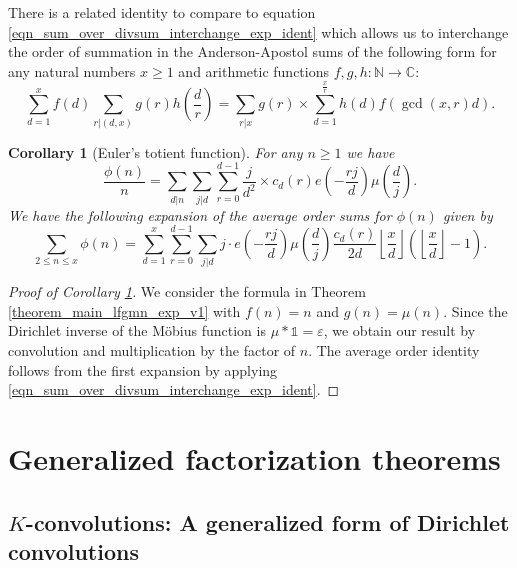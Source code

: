 \documentclass[12pt,reqno,a4letter]{article}
\numberwithin{figure}{section}
\numberwithin{table}{section}
\numberwithin{equation}{section}
\newcommand{\floor}[1]{\left\lfloor #1 \right\rfloor}
\newcommand{\e}[1]{e\left(#1\right)}
\theoremstyle{plain}
\newtheorem{cor}[theorem]{Corollary}
\numberwithin{theorem}{section}
\theoremstyle{definition}
\begin{document}
There is a related identity to compare to 
equation \eqref{eqn_sum_over_divsum_interchange_exp_ident} 
which allows us to interchange the order of 
summation in the Anderson-Apostol sums of the following form 
for any natural numbers $x \geq 1$ and arithmetic functions 
$f,g,h: \mathbb{N} \rightarrow \mathbb{C}$: 
\[
\sum_{d=1}^x f(d) \sum_{r|(d,x)} g(r) h\left(\frac{d}{r}\right) = 
       \sum_{r|x} g(r) \times \sum_{d=1}^{\frac{x}{r}} h(d) 
       f\left(\gcd(x,r) d\right). 
\]

\begin{cor}[Euler's totient function]
\label{cor_EulersTotientFunc_v5}
For any $n \geq 1$ we have 
\[
\frac{\phi(n)}{n} = \sum_{d|n} \sum_{j|d} \sum_{r=0}^{d-1} \frac{j}{d^2} \times c_d(r) 
     \e{-\frac{rj}{d}} \mu\left(\frac{d}{j}\right). 
\]
We have the following expansion of the average order sums for $\phi(n)$ 
given by 
\[
\sum_{2 \leq n \leq x} \phi(n) = \sum_{d=1}^x \sum_{r=0}^{d-1} \sum_{j|d}  
     j \cdot \e{-\frac{rj}{d}} \mu\left(\frac{d}{j}\right)  
     \frac{c_d(r)}{2d} \floor{\frac{x}{d}}\left(\floor{\frac{x}{d}}-1\right). 
\] 
\end{cor} 
\begin{proof}[Proof of Corollary \ref{cor_EulersTotientFunc_v5}]
We consider the formula in Theorem \ref{theorem_main_lfgmn_exp_v1} with 
$f(n) = n$ and $g(n) = \mu(n)$. Since the Dirichlet inverse of the M\"obius 
function is $\mu \ast \mathds{1} = \varepsilon$, we obtain our result by convolution and 
multiplication by the factor of $n$. The average order identity follows from the 
first expansion by applying \eqref{eqn_sum_over_divsum_interchange_exp_ident}. 
\end{proof} 

\newpage
\section{Generalized factorization theorems} 

\subsection{$K$-convolutions: A generalized form of Dirichlet convolutions} 
\label{subSection_GenSummatoryFuncIdents_KCvls}
\end{document}
